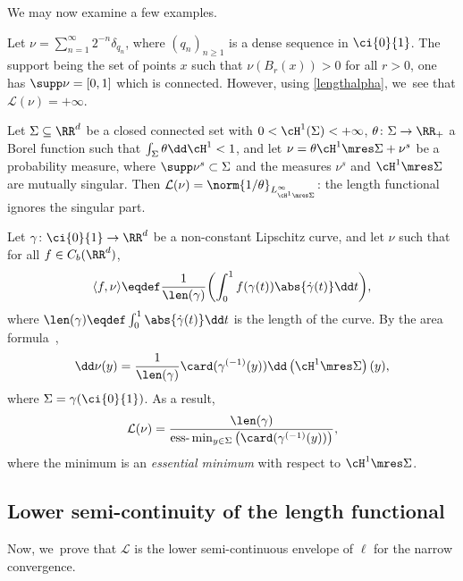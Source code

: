 We may now examine a few examples.
\begin{example}\label{example.diracs_dense_sequence}
Let $\nu=\sum_{n=1}^{\infty} 2^{-n}\delta_{q_n}$, where $(q_{n})_{n\ge 1}$ is a dense sequence in $\ci{0}{1}$. The support being the set of points $x$ such that $\nu(B_r(x)) > 0$ for all $r>0$, one has $\supp \nu = [0,1]$ which is connected. However, using \eqref{lengthalpha}, we~see that $\mathcal{L}(\nu)=+\infty$.
\end{example}

\begin{example}\label{example.densities_rectifiable_set}
Let $\Sigma \subseteq \RR^d$ be a closed connected set with $0<\cH^1(\Sigma)<+\infty$, $\theta\colon \Sigma \rightarrow \RR_+$ a Borel function such that $ \int_\Sigma \theta\dd \cH^1 < 1$, and let $\nu = \theta \cH^1\mres \Sigma + \nu^s$ be a probability measure, where $\supp \nu^s \subset \Sigma$ and the measures $\nu^s$ and $\cH^1\mres\Sigma$ are mutually singular.
Then $\mathcal{L}(\nu)= \norm{1/\theta}_{L^\infty_{\cH^1\mres \Sigma}}$: the length functional ignores the singular part.
\end{example}

\begin{example}\label{example.parametrized_curve}
Let $\gamma\colon \ci{0}{1}\rightarrow \RR^d$ be a non-constant Lipschitz curve, and let $\nu$ such that for all $f \in C_b(\RR^d)$,
\[
\langle f, \nu\rangle \eqdef \frac{1}{\len(\gamma)}\biggl(\int_0^1f(\gamma(t))\abs{\dot\gamma(t)}\dd t\biggr),
\]
where $\len(\gamma)\eqdef \int_0^1 \abs{\dot\gamma(t)}\dd t$ is the length of the curve.
By the area formula~\cite[Th.\,3.2.5]{federer2014geometric},
\begin{equation*}
\dd\nu(y)= \frac{1}{\len(\gamma)} \card(\gamma^{(-1)}(y))\dd\left( \cH^1\mres \Sigma\right)(y),
\end{equation*}
where $\Sigma=\gamma(\ci{0}{1})$. As a result,
\begin{equation}
\mathcal{L}(\nu) = \frac{\len(\gamma)}{\mathrm{ess}\mbox{-}\min_{y \in\Sigma}\left(\card(\gamma^{(-1)}(y))\right)},
\end{equation}
where the minimum is an \emph{essential minimum} with respect to $\cH^1\mres \Sigma$.
\end{example}

\subsection{Lower semi-continuity of the length functional}
\label{sec.length_functional_is_lsc}
Now, we~prove that $\mathcal{L}$ is the lower semi-continuous envelope of $\ell$ for the narrow convergence.

